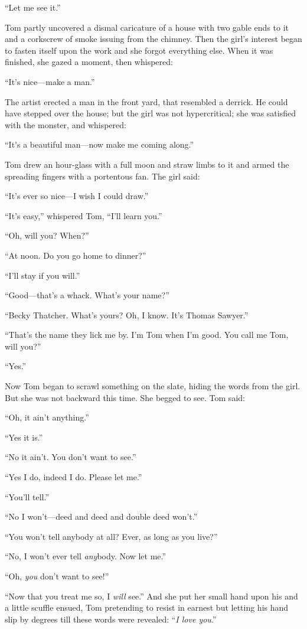 \documentclass{book}
\begin{document}
“Let me see it.”

Tom partly uncovered a dismal caricature of a house with two gable ends to it and a corkscrew of smoke issuing from the chimney. Then the girl’s interest began to fasten itself upon the work and she forgot everything else. When it was finished, she gazed a moment, then whispered:

“It’s nice—make a man.”

The artist erected a man in the front yard, that resembled a derrick. He could have stepped over the house; but the girl was not hypercritical; she was satisfied with the monster, and whispered:

“It’s a beautiful man—now make me coming along.”

Tom drew an hour-glass with a full moon and straw limbs to it and armed the spreading fingers with a portentous fan. The girl said:

“It’s ever so nice—I wish I could draw.”

“It’s easy,” whispered Tom, “I’ll learn you.”

“Oh, will you? When?”

“At noon. Do you go home to dinner?”

“I’ll stay if you will.”

“Good—that’s a whack. What’s your name?”

“Becky Thatcher. What’s yours? Oh, I know. It’s Thomas Sawyer.”

“That’s the name they lick me by. I’m Tom when I’m good. You call me Tom, will you?”

“Yes.”

Now Tom began to scrawl something on the slate, hiding the words from the girl. But she was not backward this time. She begged to see. Tom said:

“Oh, it ain’t anything.”

“Yes it is.”

“No it ain’t. You don’t want to see.”

“Yes I do, indeed I do. Please let me.”

“You’ll tell.”

“No I won’t—deed and deed and double deed won’t.”

“You won’t tell anybody at all? Ever, as long as you live?”

“No, I won’t ever tell \emph{any}body. Now let me.”

“Oh, \emph{you} don’t want to see!”

“Now that you treat me so, I \emph{will} see.” And she put her small hand upon his and a little scuffle ensued, Tom pretending to resist in earnest but letting his hand slip by degrees till these words were revealed: “\emph{I love you}.”
\end{document}
